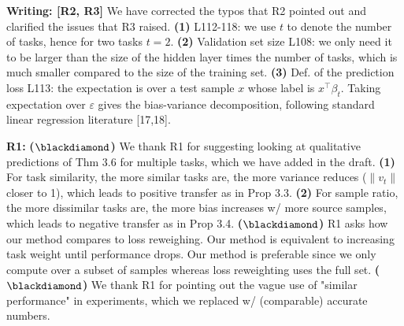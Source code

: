 \documentclass{article}
\begin{document}
\vspace{-0.025in}
\textbf{Writing: [R2, R3]}
We have corrected the typos that R2 pointed out and clarified the issues that R3 raised.
\textbf{(1)} L112-118: we use $t$ to denote the number of tasks, hence for two tasks $t = 2$.
\textbf{(2)} Validation set size L108: we only need it to be larger than the size of the hidden layer times the number of tasks, which is much smaller compared to the size of the training set.
\textbf{(3)} Def. of the prediction loss L113: the expectation is over a test sample $x$ whose label is $x^{\top}\beta_t$.
Taking expectation over $\varepsilon$ gives  the bias-variance decomposition, following standard linear regression literature [17,18].

\vspace{-0.025in}
\textbf{R1:}
\textbf{($\blackdiamond$)} We thank R1 for suggesting looking at qualitative predictions of Thm 3.6 for multiple tasks, which we have added in the  draft.
\textbf{(1)} For task similarity, the more similar tasks are, the more variance reduces ($\|{v_t}\|$ closer to 1), which leads to positive transfer as in Prop 3.3.
\textbf{(2)} For sample ratio, the more dissimilar tasks are, the more bias increases w/ more source samples, which leads to negative transfer as in Prop 3.4.
\textbf{($\blackdiamond$)} R1 asks how our method compares to loss reweighing.
Our method is equivalent to increasing task weight until performance drops.
Our method is preferable since we only compute over a subset of samples whereas loss reweighting uses the full set.
\textbf{($\blackdiamond$)} We thank R1 for pointing out the vague use of "similar performance" in experiments, which we replaced w/ (comparable) accurate numbers. %
\end{document}
